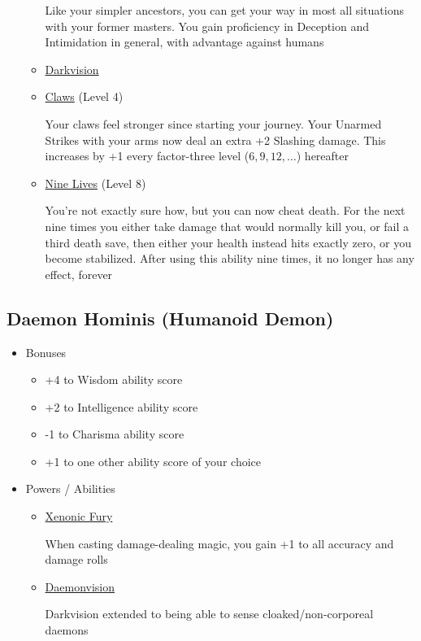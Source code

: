 \documentclass[12pt, twoside]{article}
\begin{document}
\begin{FlushLeft}
\begin{multicols}{2}
\begin{itemize}[wide]
\begin{itemize}
					Like your simpler ancestors, you can get your way in most all situations with your former masters.
					You gain proficiency in Deception and Intimidation in general, with advantage against humans
					\item \underline{Darkvision}
					\item \underline{Claws} (Level 4)

					Your claws feel stronger since starting your journey.
					Your Unarmed Strikes with your arms now deal an extra +2 Slashing damage. This increases by +1 every factor-three level ($6, 9, 12, \dots$) hereafter

					\item \underline{Nine Lives} (Level 8)

					You’re not exactly sure how, but you can now cheat death.
					For the next nine times you either take damage that would normally kill you, or fail a third death save, then either your health instead hits exactly zero, or you become stabilized.
					After using this ability nine times, it no longer has any effect, forever
				\end{itemize}
			\end{itemize}
			\vfill \pagebreak

			\subsection{Daemon Hominis (Humanoid Demon)}
			\begin{itemize}[wide]
				\item Bonuses
				\begin{itemize}
					\item +4 to Wisdom ability score
					\item +2 to Intelligence ability score
					\item -1 to Charisma ability score
					\item +1 to one other ability score of your choice
				\end{itemize}
				\item Powers / Abilities
				\begin{itemize}
					\item \underline{Xenonic Fury}

					When casting damage-dealing magic, you gain +1 to all accuracy and damage rolls

					\item \underline{Daemonvision}

					Darkvision extended to being able to sense cloaked/non-corporeal daemons


\end{itemize}
\end{itemize}
\end{multicols}
\end{FlushLeft}
\end{document}
